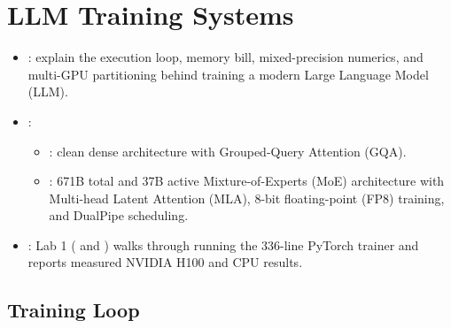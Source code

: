 \chapter{LLM Training Systems}

\begin{itemize}
    \item {}: explain the execution loop, memory bill, mixed-precision numerics, and multi-GPU partitioning behind training a modern Large Language Model (LLM).
    \item {}:
    \begin{itemize}
        \item {}: clean dense architecture with Grouped-Query Attention (GQA).
        \item {}: 671B total and 37B active Mixture-of-Experts (MoE) architecture with Multi-head Latent Attention (MLA), 8-bit floating-point (FP8) training, and DualPipe scheduling.
    \end{itemize}
    \item {}: Lab 1 ( and ) walks through running the 336-line PyTorch trainer and reports measured NVIDIA H100 and CPU results.
\end{itemize}

\section{Training Loop}


